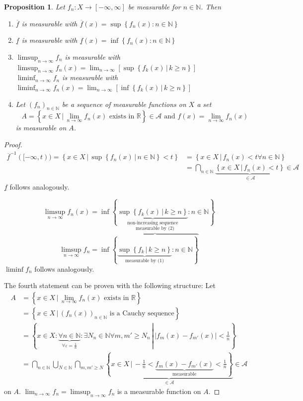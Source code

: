 \documentclass{article}
\newtheorem{proposition}{Proposition}  \numberwithin{proposition}{section}
\newcommand{\set}[1]{\left\{#1\right\}}
\newcommand{\setdef}[2]{\left\{\left.#1\,\right|\,#2\right\}}
\newcommand{\card}[1]{\left|#1\right|}
\begin{document}
\begin{proposition} %
  Let $f_n: X \to [-\infty, \infty]$ be measurable for $n \in \mathbb N$. Then
  \begin{enumerate}
    \item $\overline{f}$ is measurable with $\overline{f}(x) = \sup\set{f_n(x): n \in \mathbb N}$
    \item $\underline{f}$ is measurable with $\underline{f}(x) = \inf\set{f_n(x): n \in \mathbb N}$
    \item $\limsup_{n\to\infty} f_n$ is measurable with $\limsup_{n \to \infty} f_n(x) = \lim_{n\to\infty} \left[\sup\setdef{f_k(x)}{k \geq n}\right]$ \\
          $\liminf_{n\to\infty} f_n$ is measurable with $\liminf_{n \to \infty} f_n(x) = \lim_{n\to\infty} \left[\inf\setdef{f_k(x)}{k \geq n}\right]$
    \item Let $(f_n)_{n \in \mathbb N}$ be a sequence of measurable functions on $X$ a set
          \[ A = \setdef{x \in X}{\lim_{n\to\infty} f_n(x) \text{ exists in } \mathbb R} \in \mathcal A \text{ and } f(x) = \lim_{n\to\infty} f_n(x) \]
          is measurable on $A$.
  \end{enumerate}
\end{proposition}
\begin{proof}
  \begin{align*}
    \overline{f}^{-1}([-\infty, t)) = \setdef{x \in X}{\sup\setdef{f_n(x)}{n \in \mathbb N} < t}
    	&= \setdef{x \in X}{f_n(x) < t \forall n \in \mathbb N} \\
    	&= \bigcap_{n \in \mathbb N} \underbrace{\setdef{x \in X}{f_n(x) < t}}_{\in \mathcal A} \in \mathcal A
  \end{align*}
  $\underline{f}$ follows analogously.

  \[ \limsup_{n\to\infty} f_n(x) = \inf\set{\underbrace{\sup\setdef{f_k(x)}{k \geq n}}_{\text{non-increasing sequence}}: n \in \mathbb N} \]
  \[ \limsup_{n\to\infty} f_n = \inf\overbrace{\set{\underbrace{\sup\setdef{f_k}{k \geq n}}_{\text{measurable by (1)}}: n \in \mathbb N}}^{\text{measurable by (2)}} \]
  $\liminf f_n$ follows analogously.

  The fourth statement can be proven with the following structure: Let
  \begin{align*}
    A &= \setdef{x \in X}{\lim_{n\to\infty}{f_n(x) \text{ exists in } \mathbb R}} \\
      &= \setdef{x \in X}{(f_n(x))_{n \in \mathbb N} \text{ is a Cauchy sequence}} \\
      &= \setdef{x \in X: \underbrace{\forall n \in \mathbb N}_{\forall \varepsilon = \frac1n}: \exists N_n \in \mathbb N \forall m, m' \geq N_n}{\card{f_m(x) - f_{m'}(x)} < \frac1n} \\
      &= \bigcap_{n \in \mathbb N} \bigcup_{N \in \mathbb N} \bigcap_{m, m' \geq N} \underbrace{\setdef{x \in X}{-\frac1n < \underbrace{f_m(x) - f_{m'}(x)}_{\text{measurable}} < \frac1n}}_{\in \mathcal A} \in \mathcal A
  \end{align*}
  on $A$. $\lim_{n\to\infty} f_n = \limsup_{n\to\infty} f_n$ is a measurable function on $A$.
\end{proof}
\end{document}
